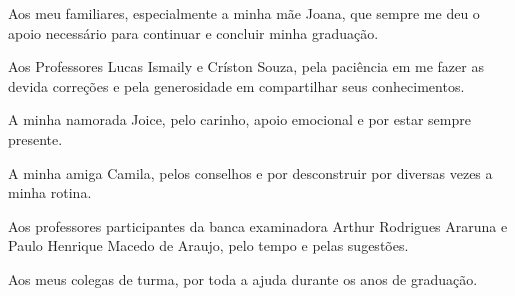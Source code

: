 Aos meu familiares, especialmente a minha mãe Joana, que sempre me deu o apoio necessário para continuar e concluir minha graduação.

Aos Professores Lucas Ismaily e Críston Souza, pela paciência em me fazer as devida correções e pela generosidade em compartilhar seus conhecimentos.

A minha namorada Joice, pelo carinho, apoio emocional e por estar sempre presente.

A minha amiga Camila, pelos conselhos e por desconstruir por diversas vezes a minha rotina.

Aos professores participantes da banca examinadora Arthur Rodrigues Araruna e Paulo Henrique Macedo de Araujo, pelo tempo e pelas sugestões.

Aos meus colegas de turma, por toda a ajuda durante os anos de graduação.
